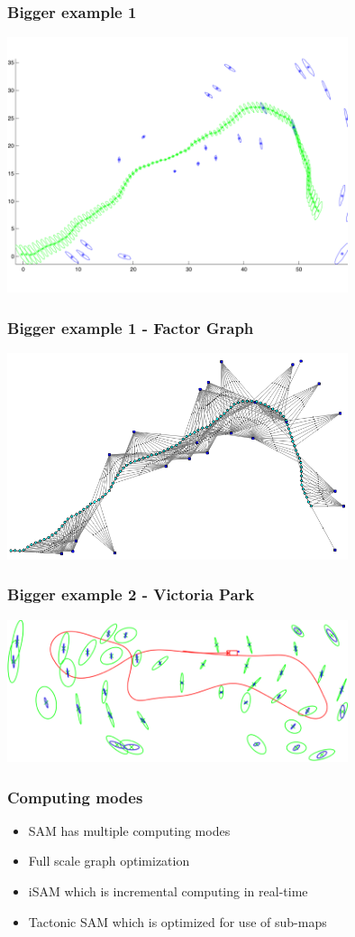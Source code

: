 \documentclass[10pt]{beamer}
\begin{document}
\begin{frame}
  \frametitle{Bigger example 1}
  \centerline{\includegraphics[width=10cm]{littleRobot.png}}
\end{frame}

\begin{frame}
  \frametitle{Bigger example 1 - Factor Graph}
  \centerline{\includegraphics[width=10cm]{little-robot-factorgraph.png}}
\end{frame}

\begin{frame}
  \frametitle{Bigger example 2 - Victoria Park}
  \centerline{\includegraphics[width=10cm]{Victoria.png}}
\end{frame}

\begin{frame}
  \frametitle{Computing modes}
  \begin{itemize}
    \item SAM has multiple computing modes
    \item Full scale graph optimization
    \item iSAM which is incremental computing in real-time
    \item Tactonic SAM which is optimized for use of sub-maps
  \end{itemize}
\end{frame}
\end{document}
